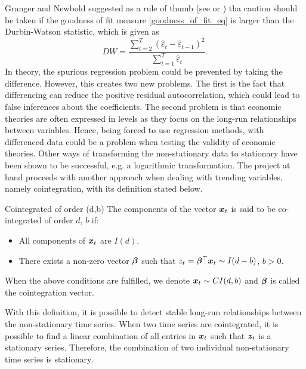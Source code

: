 \noindent Granger and Newbold suggested as a rule of thumb (see\cite{Analysis_of_integrated_and_cointegrated_time_series_with_R} or \cite{Spurious_Regressions_in_Econonmetrics_1974}) tha caution should be taken if the goodness of fit measure \ref{goodness_of_fit_eq} is larger than the Durbin-Watson statistic, which is given as
\begin{equation*}
    DW=\frac{\sum_{t=2}^T(\hat{\varepsilon}_t-\hat{\varepsilon}_{t-1})^2}{\sum_{t=1}^T\hat{\varepsilon}_t}.
\end{equation*}
In theory, the spurious regression problem could be prevented by taking the difference. However, this creates two new problems. The first is the fact that differencing can reduce the positive residual autocorrelation, which could lead to false inferences about the coefficients. The second problem is that economic theories are often expressed in levels as they focus on the long-run relationships between variables. Hence, being forced to use regression methods, with differenced data could be a problem when testing the validity of economic theories. Other ways of transforming the non-stationary data to stationary have been shown to be successful, e.g. a logarithmic transformation.
The project at hand proceeds with another approach when dealing with trending variables, namely cointegration, with its definition stated below.

\begin{defi}{Cointegrated of order (d,b)}
    The components of the vector $\boldsymbol{x}_t$ is said to be co-integrated of order $d$, $b$ if:
    \begin{itemize}
        \item All components of $\boldsymbol{x}_t$ are $I(d)$.
        \item There exists a non-zero vector $\boldsymbol{\beta}$ such that $z_t=\boldsymbol{\beta}^\top \boldsymbol{x}_t\sim I(d-b)$, $b>0$.
    \end{itemize}
    When the above conditions are fulfilled, we denote $\boldsymbol{x}_t\sim CI(d,b)$ and $\boldsymbol{\beta}$ is called the cointegration vector.
    \label{Def:Co-integrated of order d,b}
\end{defi}
 
\noindent With this definition, it is possible to detect stable long-run relationships between the non-stationary time series. When two time series are cointegrated, it is possible to find a linear combination of all entries in $\boldsymbol{x}_t$ such that $\boldsymbol{z}_t$ is a stationary series. Therefore, the combination of two individual non-stationary time series is stationary.
 


